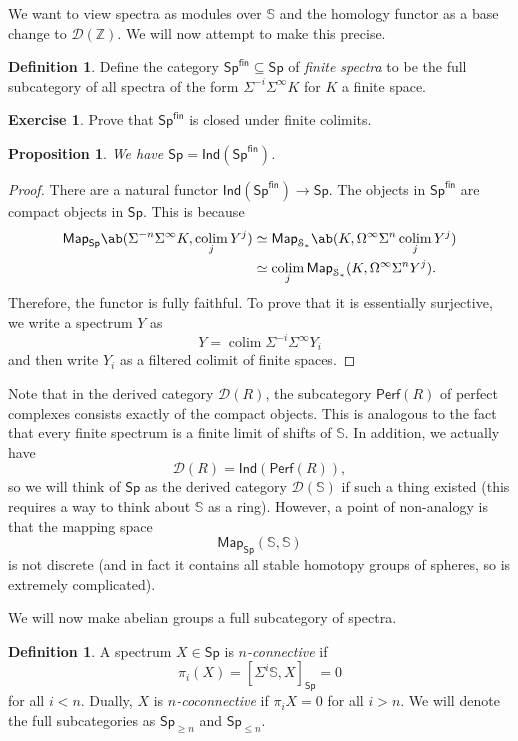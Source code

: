 \documentclass[10pt]{amsart}
\newtheorem{prop}[thm]{Proposition}
\theoremstyle{definition}
\newtheorem{defn}[thm]{Definition}
\newtheorem{exer}[thm]{Exercise}
\theoremstyle{remark}
\theoremstyle{plain}
\theoremstyle{definition}
\theoremstyle{remark}
\newcommand{\Z}{\mathbb{Z}}
\newcommand{\bS}{\mathbb{S}}
\newcommand{\mc}[1]{\mathcal{#1}}
\newcommand{\ms}[1]{\mathsf{#1}}
\newcommand{\1}{\mathbf{1}}
\newcommand{\2}{\mathbf{2}}
\newcommand{\3}{\mathbf{3}}
\DeclareMathOperator*{\colim}{colim}
\begin{document}
We want to view spectra as modules over $\bS$ and the homology functor as a base change to $\mc{D}(\Z)$. We will now attempt to make this precise.

\begin{defn}
    Define the category $\ms{Sp}^{\ms{fin}} \subseteq \ms{Sp}$ of \textit{finite spectra} to be the full subcategory of all spectra of the form $\Sigma^{-i} \Sigma^{\infty} K$ for $K$ a finite space.
\end{defn}

\begin{exer}
    Prove that $\ms{Sp}^{\ms{fin}}$ is closed under finite colimits.
\end{exer}

\begin{prop}
    We have $\ms{Sp} = \ms{Ind}(\ms{Sp}^{\ms{fin}})$.
\end{prop}

\begin{proof}
    There are a natural functor $\ms{Ind}(\ms{Sp}^{\ms{fin}}) \to \ms{Sp}$. The objects in $\ms{Sp}^{\ms{fin}}$ are compact objects in $\ms{Sp}$. This is because
    \begin{align*}
        \ms{Map}_{\ms{Sp}}\ab(\Sigma^{-n} \Sigma^{\infty} K, \colim_j Y^j) &\simeq \ms{Map}_{\mc{S}_*} \ab(K, \Omega^{\infty} \Sigma^n \colim_j Y^j) \\
        &\simeq \colim_j \ms{Map}_{\mc{S}_*}(K, \Omega^{\infty} \Sigma^n Y^j).
    \end{align*}
    Therefore, the functor is fully faithful. To prove that it is essentially surjective, we write a spectrum $Y$ as
    \[ Y = \colim \Sigma^{-i} \Sigma^{\infty} Y_i \]
    and then write $Y_i$ as a filtered colimit of finite spaces.
\end{proof}

Note that in the derived category $\mc{D}(R)$, the subcategory $\ms{Perf}(R)$ of perfect complexes consists exactly of the compact objects. This is analogous to the fact that every finite spectrum is a finite limit of shifts of $\bS$. In addition, we actually have
\[ \mc{D}(R) = \ms{Ind}(\ms{Perf}(R)), \]
so we will think of $\ms{Sp}$ as the derived category $\mc{D}(\bS)$ if such a thing existed (this requires a way to think about $\bS$ as a ring). However, a point of non-analogy is that the mapping space
\[ \ms{Map}_{\ms{Sp}}(\bS, \bS) \]
is not discrete (and in fact it contains all stable homotopy groups of spheres, so is extremely complicated).

We will now make abelian groups a full subcategory of spectra.
\begin{defn}
    A spectrum $X \in \ms{Sp}$ is \textit{$n$-connective} if 
    \[ \pi_i (X) = [\Sigma^i \bS, X]_{\ms{Sp}} = 0 \] 
    for all $i < n$. Dually, $X$ is \textit{$n$-coconnective} if $\pi_i X = 0$ for all $i > n$. We will denote the full subcategories as $\ms{Sp}_{\geq n}$ and $\ms{Sp}_{\leq n}$.
\end{defn}
\end{document}
